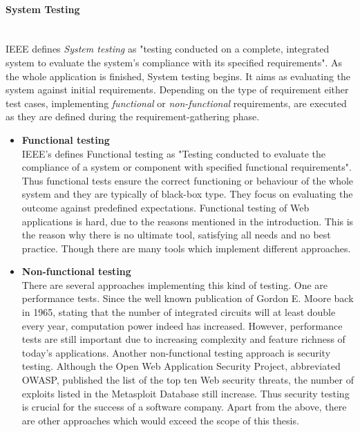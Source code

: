 \documentclass[12pt, notitlepage]{article}
\begin{document}
\paragraph{System Testing} ~\\
IEEE defines \textit{System testing}\cite{ieee-definition} as "testing conducted on a complete, integrated system to evaluate the system's compliance with its specified requirements". As the whole application is finished, System testing begins. It aims as evaluating the system against initial requirements.
Depending on the type of requirement either test cases, implementing \textit{functional} or \textit{non-functional} requirements, are executed as they are defined during the requirement-gathering phase. 
\begin{itemize}
	\item \textbf{Functional testing}\\
	IEEE's defines Functional testing\cite{ieee-definition} as
	"Testing conducted to evaluate the compliance of a system or component with specified functional requirements". Thus functional tests ensure
	the correct functioning or behaviour of the whole system and they are typically of black-box type.
	They focus on evaluating the outcome against predefined expectations. Functional testing of Web applications is hard, due to the
	reasons mentioned in the introduction. This is the reason why there is no ultimate tool, satisfying all needs and no best practice. Though there are many
	tools which implement different approaches.
	\item \textbf{Non-functional testing}\\
	There are several approaches implementing this kind of testing. One are performance tests. Since the well known publication of Gordon E. Moore back in 
	1965\cite{moore}, stating that the number of integrated circuits will at least double every year, computation power indeed has increased.
	However, performance tests are still important due to increasing complexity and feature richness of today’s applications. Another non-functional 
	testing approach is security testing. Although the Open Web Application Security Project, abbreviated OWASP\cite{owasp}, published the list of the top ten
	Web security threats, the number of exploits listed in the Metasploit Database\cite{metasploit} still increase. Thus security testing is crucial for the success
	of a software company. Apart from the above, there are other approaches which would exceed the scope of this thesis. 
\end{itemize}
\end{document}
